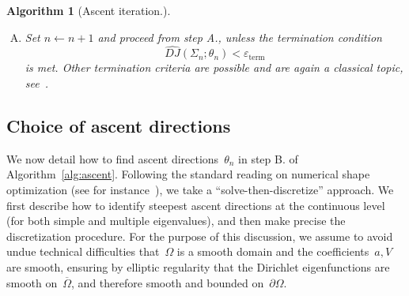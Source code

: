 \documentclass[a4]{article}
\newcommand{\1}{\mathbbm 1}
\newtheorem{algorithm}{Algorithm}
\begin{document}
\begin{algorithm}[Ascent iteration.]
\begin{enumerate}[A.]
{    The geometry of the mesh~$\widetilde{\Sigma}_{n+1}$ is defined by the set of new vertices~$\widetilde{\mathcal V}_{n+1}$, inheriting its combinatorial structure from~$\Sigma_n$.
    If~$\widetilde{\Sigma}_{n+1}$ is a valid mesh for a domain~$\Omega_{n+1}$, i.e. satisfies the FEM conditions~\eqref{eq:mesh_conditions}, set~$\Sigma_{n+1} = \mathcal A\left(\widetilde{\Sigma}_{n+1}\right)$, where~$\mathcal A$ is a local mesh refinement procedure designed to preserve meshing quality, namely the {\selectfont adaptmesh} function from FreeFem++.
    Otherwise, set~$\eta_n \leftarrow \alpha\eta_n$ and repeat this step. For the sake of computational efficiency and simplicity, we limit ourselves to a fixed maximal step size $\eta_{\max}$, although various other strategies to select~$\eta_n$ are a classical topic in numerical optimization, see~\cite[Chapter 3]{NW99}.
    }
    \item{Set $n\leftarrow n+1$ and proceed from step A., unless the termination condition
    $$\widehat{DJ}(\Sigma_n;\theta_n)< \varepsilon_{\mathrm{term}}$$
    is met. Other termination criteria are possible and are again a classical topic, see~\cite{NW99}.
    }
\end{enumerate}
\end{algorithm}

\subsection{Choice of ascent directions}
\label{subsec:ascent_direction}
We now detail how to find ascent directions~$\theta_n$ in step B. of Algorithm~\ref{alg:ascent}. Following the standard reading on numerical shape optimization (see for instance~\cite[Section 6.5]{AS07}), we take a ``solve-then-discretize'' approach. We first describe how to identify steepest ascent directions at the continuous level (for both simple and multiple eigenvalues), and then make precise the discretization procedure.
For the purpose of this discussion, we assume to avoid undue technical difficulties that~$\Omega$ is a smooth domain and the coefficients~$a,V$ are smooth, ensuring by elliptic regularity that the Dirichlet eigenfunctions are smooth on~$\overline{\Omega}$, and therefore smooth and bounded on~$\partial\Omega$.
\end{document}

